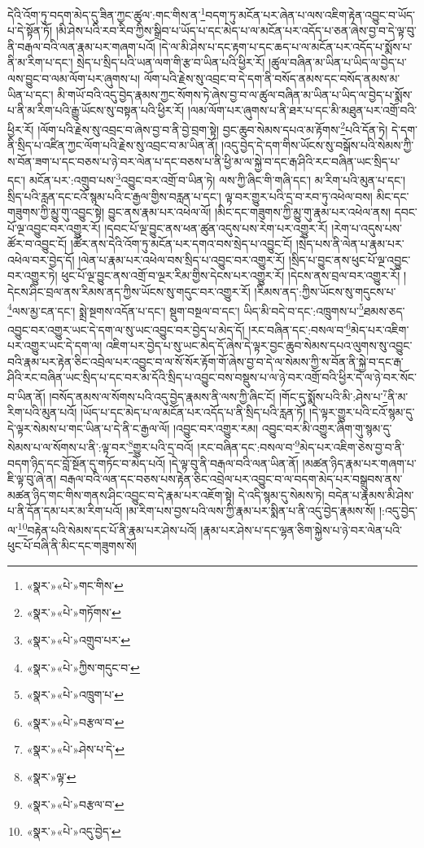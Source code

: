 དེའི་འོག་ཏུ་བདག་མེད་དུ་ཟིན་ཀྱང་ཚུལ་:གང་གིས་ན་\footnote{«སྣར་»«པེ་»གང་གིས་}བདག་ཏུ་མངོན་པར་ཞེན་པ་ལས་འཇིག་རྟེན་འབྱུང་བ་ཡོད་པ་དེ་སྟོན་ཏོ། །མི་ཤེས་པའི་རབ་རིབ་ཀྱིས་སྒྲིབ་པ་ཡོད་པ་དང་མེད་པ་ལ་མངོན་པར་འདོད་པ་ཅན་ཞེས་བྱ་བ་དེ་ལྟ་བུ་ནི་བརྒལ་བའི་ལན་རྣམ་པར་གཞག་པའོ། །དེ་ལ་མི་ཤེས་པ་དང་རྟག་པ་དང་ཆད་པ་ལ་མངོན་པར་འདོད་པ་སྨོས་པ་ནི་མ་རིག་པ་དང་། སྲེད་པ་སྲིད་པའི་ཡན་ལག་གི་རྩ་བ་ཡིན་པའི་ཕྱིར་རོ། །ཚུལ་བཞིན་མ་ཡིན་པ་ཡིད་ལ་བྱེད་པ་ལས་བྱུང་བ་ལམ་ལོག་པར་ཞུགས་པ། ལོག་པའི་རྗེས་སུ་འབྲང་བ་དེ་དག་ནི་བསོད་ནམས་དང་བསོད་ནམས་མ་ཡིན་པ་དང་། མི་གཡོ་བའི་འདུ་བྱེད་རྣམས་ཀྱང་སོགས་ཏེ་ཞེས་བྱ་བ་ལ་ཚུལ་བཞིན་མ་ཡིན་པ་ཡིད་ལ་བྱེད་པ་སྨོས་པ་ནི་མ་རིག་པའི་རྒྱུ་ཡོངས་སུ་བསྟན་པའི་ཕྱིར་རོ། །ལམ་ལོག་པར་ཞུགས་པ་ནི་ཐར་པ་དང་མི་མཐུན་པར་འགྲོ་བའི་ཕྱིར་རོ། །ལོག་པའི་རྗེས་སུ་འབྲང་བ་ཞེས་བྱ་བ་ནི་བྱེ་བྲག་སྟེ། བྱང་ཆུབ་སེམས་དཔའ་མ་རྟོགས་\footnote{«སྣར་»«པེ་»གཏོགས་}པའི་དོན་ཏེ། དེ་དག་ནི་སྲིད་པ་འཛིན་ཀྱང་ལོག་པའི་རྗེས་སུ་འབྲང་བ་མ་ཡིན་ནོ། །འདུ་བྱེད་དེ་དག་གིས་ཡོངས་སུ་བསྒོས་པའི་སེམས་ཀྱི་ས་བོན་ཟག་པ་དང་བཅས་པ་ཉེ་བར་ལེན་པ་དང་བཅས་པ་ནི་ཕྱི་མ་ལ་སྐྱེ་བ་དང་རྒ་ཤིའི་རང་བཞིན་ཡང་སྲིད་པ་དང་། མངོན་པར་:འགྲུབ་པས་\footnote{«སྣར་»«པེ་»འགྲུབ་པར་}འབྱུང་བར་འགྲོ་བ་ཡིན་ཏེ། ལས་ཀྱི་ཞིང་གི་གཞི་དང་། མ་རིག་པའི་མུན་པ་དང་། སྲིད་པའི་རླན་དང་ངའོ་སྙམ་པའི་ང་རྒྱལ་གྱིས་བརླན་པ་དང་། ལྟ་བར་གྱུར་པའི་དྲ་བ་རབ་ཏུ་འཕེལ་བས། མིང་དང་གཟུགས་ཀྱི་མྱུ་གུ་འབྱུང་སྟེ། བྱུང་ནས་རྣམ་པར་འཕེལ་ལོ། །མིང་དང་གཟུགས་ཀྱི་མྱུ་གུ་རྣམ་པར་འཕེལ་ནས། དབང་པོ་ལྔ་འབྱུང་བར་འགྱུར་རོ། །དབང་པོ་ལྔ་བྱུང་ནས་ཕན་ཚུན་འདུས་པས་རེག་པར་འགྱུར་རོ། །རེག་པ་འདུས་པས་ཚོར་བ་འབྱུང་ངོ། །ཚོར་ནས་དེའི་འོག་ཏུ་མངོན་པར་དགའ་བས་སྲེད་པ་འབྱུང་ངོ། །སྲེད་པས་ནི་ལེན་པ་རྣམ་པར་འཕེལ་བར་བྱེད་དོ། །ལེན་པ་རྣམ་པར་འཕེལ་བས་སྲིད་པ་འབྱུང་བར་འགྱུར་རོ། །སྲིད་པ་བྱུང་ནས་ཕུང་པོ་ལྔ་འབྱུང་བར་འགྱུར་ཏེ། ཕུང་པོ་ལྔ་བྱུང་ནས་འགྲོ་བ་ལྔར་རིམ་གྱིས་དེངས་པར་འགྱུར་རོ། །དེངས་ནས་བྲལ་བར་འགྱུར་རོ། །དེངས་ཤིང་བྲལ་ནས་རིམས་ནད་ཀྱིས་ཡོངས་སུ་གདུང་བར་འགྱུར་རོ། །རིམས་ནད་:ཀྱིས་ཡོངས་སུ་གདུངས་པ་\footnote{«སྣར་»«པེ་»ཀྱིས་གདུང་བ་}ལས་མྱ་ངན་དང་། སྨྲེ་སྔགས་འདོན་པ་དང་། སྡུག་བསྔལ་བ་དང་། ཡིད་མི་བདེ་བ་དང་:འཁྲུགས་པ་\footnote{«སྣར་»«པེ་»འཁྲུག་པ་}ཐམས་ཅད་འབྱུང་བར་འགྱུར་ཡང་དེ་དག་ལ་སུ་ཡང་འབྱུང་བར་བྱེད་པ་མེད་དོ། །རང་བཞིན་དང་:བསལ་བ་\footnote{«སྣར་»«པེ་»བརྩལ་བ་}མེད་པར་འཇིག་པར་འགྱུར་ཡང་དེ་དག་ལ། འཇིག་པར་བྱེད་པ་སུ་ཡང་མེད་དོ་ཞེས་དེ་ལྟར་བྱང་ཆུབ་སེམས་དཔའ་ལུགས་སུ་འབྱུང་བའི་རྣམ་པར་རྟེན་ཅིང་འབྲེལ་པར་འབྱུང་བ་ལ་སོ་སོར་རྟོག་གོ་ཞེས་བྱ་བ་དེ་ལ་སེམས་ཀྱི་ས་བོན་ནི་སྐྱེ་བ་དང་རྒ་ཤིའི་རང་བཞིན་ཡང་སྲིད་པ་དང་བར་མ་དོའི་སྲིད་པ་འབྱུང་བས་བསྡུས་པ་ལ་ཉེ་བར་འགྲོ་བའི་ཕྱིར་དེ་ལ་ཉེ་བར་སོང་བ་ཡིན་ནོ། །བསོད་ནམས་ལ་སོགས་པའི་འདུ་བྱེད་རྣམས་ནི་ལས་ཀྱི་ཞིང་ངོ། །གོང་དུ་སྨོས་པའི་མི་:ཤེས་པ་\footnote{«སྣར་»«པེ་»ཤེས་པ་དེ་}ནི་མ་རིག་པའི་མུན་པའོ། །ཡོད་པ་དང་མེད་པ་ལ་མངོན་པར་འདོད་པ་ནི་སྲིད་པའི་རླན་ཏོ། །དེ་ལྟར་གྱུར་པའི་ངའོ་སྙམ་དུ་དེ་ལྟར་སེམས་པ་གང་ཡིན་པ་དེ་ནི་ང་རྒྱལ་ལོ། །འབྱུང་བར་འགྱུར་རམ། འབྱུང་བར་མི་འགྱུར་ཞིག་གུ་སྙམ་དུ་སེམས་པ་ལ་སོགས་པ་ནི་:ལྟ་བར་\footnote{«སྣར་»ལྟ་}གྱུར་པའི་དྲ་བའོ། །རང་བཞིན་དང་:བསལ་བ་\footnote{«སྣར་»«པེ་»བརྩལ་བ་}མེད་པར་འཇིག་ཅེས་བྱ་བ་ནི་བདག་ཉིད་དང་བློ་སྔོན་དུ་གཏོང་བ་མེད་པའོ། །དེ་ལྟ་བུ་ནི་བརྒལ་བའི་ལན་ཡིན་ནོ། །མཚན་ཉིད་རྣམ་པར་གཞག་པ་ཇི་ལྟ་བུ་ཞེ་ན། བརྒལ་བའི་ལན་དང་བཅས་པས་རྟེན་ཅིང་འབྲེལ་པར་འབྱུང་བ་ལ་བདག་མེད་པར་བསྒྲུབས་ནས་མཚན་ཉིད་གང་གིས་གནས་ཤིང་འབྱུང་བ་དེ་རྣམ་པར་འཇོག་སྟེ། དེ་འདི་སྙམ་དུ་སེམས་ཏེ། བདེན་པ་རྣམས་མི་ཤེས་པ་ནི་དོན་དམ་པར་མ་རིག་པའོ། །མ་རིག་པས་བྱས་པའི་ལས་ཀྱི་རྣམ་པར་སྨིན་པ་ནི་འདུ་བྱེད་རྣམས་སོ། །:འདུ་བྱེད་ལ་\footnote{«སྣར་»«པེ་»འདུ་བྱེད་}བརྟེན་པའི་སེམས་དང་པོ་ནི་རྣམ་པར་ཤེས་པའོ། །རྣམ་པར་ཤེས་པ་དང་ལྷན་ཅིག་སྐྱེས་པ་ཉེ་བར་ལེན་པའི་ཕུང་པོ་བཞི་ནི་མིང་དང་གཟུགས་སོ། 